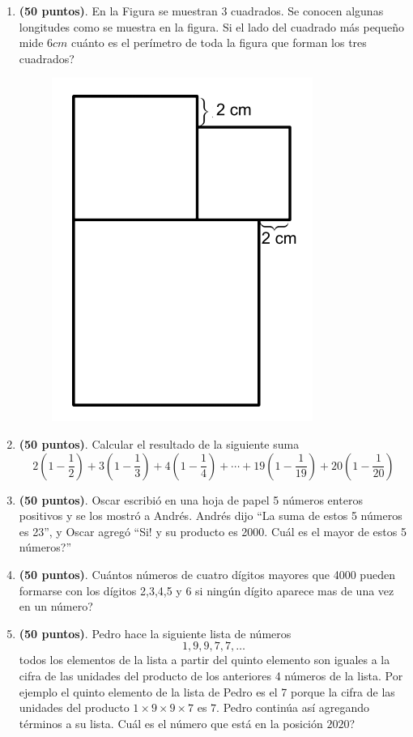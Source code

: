 \begin{enumerate}
	\item \textbf{(50 puntos)}. En la Figura se muestran 3 cuadrados. Se conocen algunas longitudes como se muestra en la figura. Si el lado del cuadrado más pequeño mide $6cm$ cuánto es el perímetro de toda la figura que forman los tres cuadrados?
	
			\begin{figure}[H]
				\centering
				\includegraphics[width=0.4\linewidth]{2020_09_12/imgs/basico_perimetro}
				\label{fig:basico_perimetro}
			\end{figure}
			
	\item \textbf{(50 puntos)}. Calcular el resultado de la siguiente suma
	\[
	2\left(1-\frac{1}{2}\right) + 3\left(1-\frac{1}{3}\right) + 4\left(1-\frac{1}{4}\right) + \cdots + 19\left(1-\frac{1}{19}\right) + 20\left(1-\frac{1}{20}\right)
	\]
			
	
	\item \textbf{(50 puntos)}. Oscar escribió en una hoja de papel 5 números enteros positivos y se los mostró a Andrés. Andrés dijo ``La suma de estos 5 números es 23'', y Oscar agregó ``Si! y su producto es 2000. Cuál es el mayor de estos 5 números?''
				

	\item \textbf{(50 puntos)}. Cuántos números de cuatro dígitos mayores que 4000 pueden formarse con los dígitos 2,3,4,5 y 6 si ningún dígito aparece mas de una vez en un número?
			
		
	\item \textbf{(50 puntos)}. Pedro hace la siguiente lista de números
	\[
	1,9,9,7,7,\dots
	\]
	todos los elementos de la lista a partir del quinto elemento son iguales a la cifra de las unidades del producto de los anteriores 4 números de la lista. Por ejemplo el quinto elemento de la lista de Pedro es el 7 porque la cifra de las unidades del producto $1\times 9\times 9\times 7$ es $7$. Pedro continúa así agregando términos a su lista. Cuál es el número que está en la posición $2020$?
\end{enumerate}




